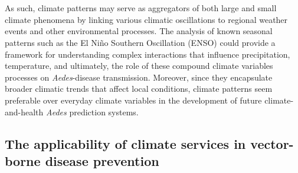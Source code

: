 \documentclass[10pt,twocolumn]{wlscirep}
\begin{document}
\\
\\
As such, climate patterns may serve as aggregators of both large and small climate phenomena by linking various climatic oscillations to regional weather events and other environmental processes\cite{lee_2018}. The analysis of known seasonal patterns such as the El Niño Southern Oscillation (ENSO) could provide a framework for understanding complex interactions that influence precipitation, temperature, and ultimately, the role of these compound climate variables processes on \textit{Aedes}-disease transmission. Moreover, since they encapsulate broader climatic trends that affect local conditions, climate patterns seem preferable over everyday climate variables in the development of future climate-and-health \textit{Aedes} prediction systems\cite{easterbrook_2016, hallett_2004}.

\subsection{The applicability of climate services in vector-borne disease prevention} \label{sec-climate-services}
\end{document}
